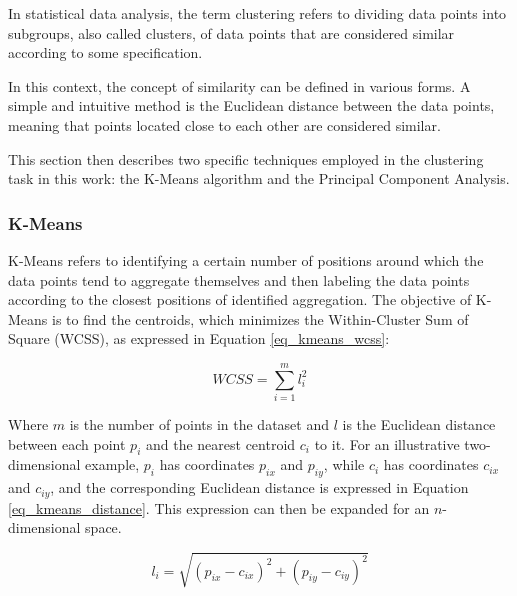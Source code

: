 \documentclass[conference]{IEEEtran}
\begin{document}
In statistical data analysis, the term clustering refers to dividing data points into subgroups, also called clusters, of data points that are considered similar according to some specification. 

In this context, the concept of similarity can be defined in various forms. A simple and intuitive method is the Euclidean distance between the data points, meaning that points located close to each other are considered similar.

This section then describes two specific techniques employed in the clustering task in this work: the K-Means algorithm and the Principal Component Analysis.

\subsubsection{K-Means}

K-Means refers to identifying a certain number of positions around which the data points tend to aggregate themselves and then labeling the data points according to the closest positions of identified aggregation. The objective of K-Means is to find the centroids, which minimizes the Within-Cluster Sum of Square (WCSS), as expressed in Equation \ref{eq_kmeans_wcss}: 


\begin{equation}
	\label{eq_kmeans_wcss}
	WCSS=\sum_{i = 1}^{m} l_{i}^{2}
\end{equation}

Where $m$ is the number of points in the dataset and $l$ is the Euclidean distance between each point $p_{i}$ and the nearest centroid $c_{i}$ to it. For an illustrative two-dimensional example, $p_{i}$ has coordinates $p_{ix}$ and $p_{iy}$, while $c_{i}$ has coordinates $c_{ix}$ and $c_{iy}$, and the corresponding Euclidean distance is expressed in Equation \ref{eq_kmeans_distance}. This expression can then be expanded for an $n$-dimensional space.

\begin{equation}
	\label{eq_kmeans_distance}
	l_{i}=\sqrt{(p_{ix} - c_{ix})^{2} + (p_{iy} - c_{iy})^{2}}
\end{equation}
\end{document}
